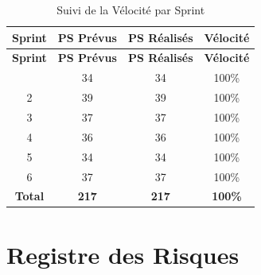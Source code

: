 \begin{center}
\begin{longtable}{cccc}
\caption{Suivi de la Vélocité par Sprint}\label{tab:velocity}\\
\toprule
\textbf{Sprint} & \textbf{PS Prévus} & \textbf{PS Réalisés} & \textbf{Vélocité} \\
\midrule
\endfirsthead
\toprule
\textbf{Sprint} & \textbf{PS Prévus} & \textbf{PS Réalisés} & \textbf{Vélocité} \\
\midrule
\endhead
\bottomrule
\endfoot
1 & 34 & 34 & 100\% \\
2 & 39 & 39 & 100\% \\
3 & 37 & 37 & 100\% \\
4 & 36 & 36 & 100\% \\
5 & 34 & 34 & 100\% \\
6 & 37 & 37 & 100\% \\
\midrule
\textbf{Total} & \textbf{217} & \textbf{217} & \textbf{100\%} \\
\bottomrule
\end{longtable}
\end{center}

\section{Registre des Risques}


